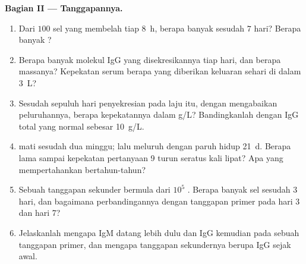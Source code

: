 \begin{problem}
\medskip
\noindent\textbf{Bagian II --- Tanggapannya.}
\begin{enumerate}[resume]
  \item Dari $100$ sel yang membelah tiap \qty{8}{h}, berapa banyak sesudah $7$
        hari? Berapa banyak ?
  \item Berapa banyak molekul IgG yang disekresikannya tiap hari, dan berapa massanya?
        Kepekatan serum berapa yang diberikan keluaran sehari di dalam
        \qty{3}{L}?
  \item Sesudah sepuluh hari penyekresian pada laju itu, dengan mengabaikan
        peluruhannya, berapa kepekatannya dalam g/L? Bandingkanlah dengan IgG
        total yang normal sebesar \qty{10}{g/L}.
  \item {} mati sesudah dua minggu;  lalu meluruh
        dengan paruh hidup \qty{21}{d}. Berapa lama sampai kepekatan
        pertanyaan 9 turun seratus kali lipat? Apa yang mempertahankan 
        bertahun-tahun?
  \item Sebuah tanggapan sekunder bermula dari $10^{5}$ . Berapa
        banyak sel sesudah $3$ hari, dan bagaimana perbandingannya dengan
        tanggapan primer pada hari 3 dan hari 7?
  \item Jelaskanlah mengapa IgM datang lebih dulu dan IgG kemudian pada sebuah
        tanggapan primer, dan mengapa tanggapan sekundernya berupa IgG sejak awal.
\end{enumerate}


\end{problem}
